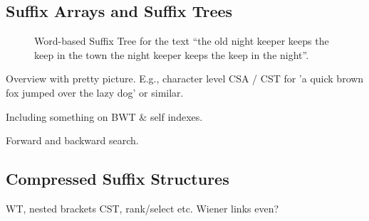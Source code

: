 
\subsection{Suffix Arrays and Suffix Trees}

\begin{figure}
\centering

\caption{Word-based Suffix Tree for the text ``the old night keeper keeps the keep in the town the night keeper keeps the keep in the night''. }
\end{figure}

Overview with pretty picture. E.g., character level CSA / CST for 
'a quick brown fox jumped over the lazy dog' or similar.

Including something on BWT \& self indexes.

Forward and backward search.

\subsection{Compressed Suffix Structures}

WT, nested brackets CST, rank/select etc. Wiener links even?

